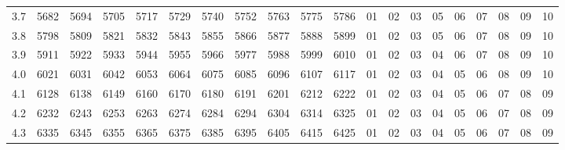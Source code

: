 \documentclass[12pt,UTF8]{ctexbook}
\begin{document}
\begin{appendix}
\begin{longtable}{|c| c c c c c | c c c c c| c c c c c c c c c|}
\scriptsize 3.7 & \scriptsize 5682 & \scriptsize 5694 & \scriptsize 5705 & \scriptsize 5717 & \scriptsize 5729 & \scriptsize 5740 & \scriptsize 5752 & \scriptsize 5763 & \scriptsize 5775 & \scriptsize 5786 & \scriptsize 01 & \scriptsize 02 & \scriptsize 03 & \scriptsize 05 & \scriptsize 06 & \scriptsize 07 & \scriptsize 08 & \scriptsize 09 & \scriptsize 10 \\
\scriptsize 3.8 & \scriptsize 5798 & \scriptsize 5809 & \scriptsize 5821 & \scriptsize 5832 & \scriptsize 5843 & \scriptsize 5855 & \scriptsize 5866 & \scriptsize 5877 & \scriptsize 5888 & \scriptsize 5899 & \scriptsize 01 & \scriptsize 02 & \scriptsize 03 & \scriptsize 05 & \scriptsize 06 & \scriptsize 07 & \scriptsize 08 & \scriptsize 09 & \scriptsize 10 \\
\scriptsize 3.9 & \scriptsize 5911 & \scriptsize 5922 & \scriptsize 5933 & \scriptsize 5944 & \scriptsize 5955 & \scriptsize 5966 & \scriptsize 5977 & \scriptsize 5988 & \scriptsize 5999 & \scriptsize 6010 & \scriptsize 01 & \scriptsize 02 & \scriptsize 03 & \scriptsize 04 & \scriptsize 06 & \scriptsize 07 & \scriptsize 08 & \scriptsize 09 & \scriptsize 10 \\
\scriptsize 4.0 & \scriptsize 6021 & \scriptsize 6031 & \scriptsize 6042 & \scriptsize 6053 & \scriptsize 6064 & \scriptsize 6075 & \scriptsize 6085 & \scriptsize 6096 & \scriptsize 6107 & \scriptsize 6117 & \scriptsize 01 & \scriptsize 02 & \scriptsize 03 & \scriptsize 04 & \scriptsize 05 & \scriptsize 06 & \scriptsize 08 & \scriptsize 09 & \scriptsize 10 \\
\scriptsize 4.1 & \scriptsize 6128 & \scriptsize 6138 & \scriptsize 6149 & \scriptsize 6160 & \scriptsize 6170 & \scriptsize 6180 & \scriptsize 6191 & \scriptsize 6201 & \scriptsize 6212 & \scriptsize 6222 & \scriptsize 01 & \scriptsize 02 & \scriptsize 03 & \scriptsize 04 & \scriptsize 05 & \scriptsize 06 & \scriptsize 07 & \scriptsize 08 & \scriptsize 09 \\
\scriptsize 4.2 & \scriptsize 6232 & \scriptsize 6243 & \scriptsize 6253 & \scriptsize 6263 & \scriptsize 6274 & \scriptsize 6284 & \scriptsize 6294 & \scriptsize 6304 & \scriptsize 6314 & \scriptsize 6325 & \scriptsize 01 & \scriptsize 02 & \scriptsize 03 & \scriptsize 04 & \scriptsize 05 & \scriptsize 06 & \scriptsize 07 & \scriptsize 08 & \scriptsize 09 \\
\scriptsize 4.3 & \scriptsize 6335 & \scriptsize 6345 & \scriptsize 6355 & \scriptsize 6365 & \scriptsize 6375 & \scriptsize 6385 & \scriptsize 6395 & \scriptsize 6405 & \scriptsize 6415 & \scriptsize 6425 & \scriptsize 01 & \scriptsize 02 & \scriptsize 03 & \scriptsize 04 & \scriptsize 05 & \scriptsize 06 & \scriptsize 07 & \scriptsize 08 & \scriptsize 09 \\

\end{longtable}
\end{appendix}
\end{document}
